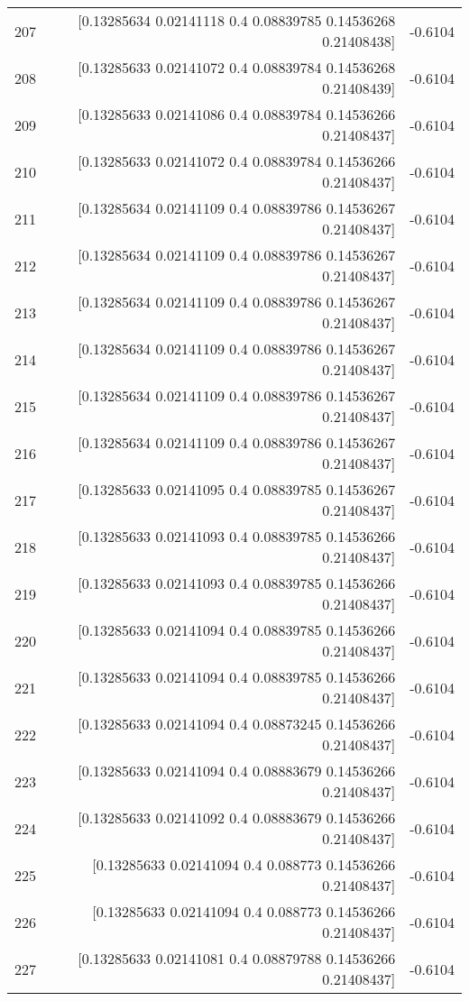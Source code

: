 \begin{longtable}{lrr}
207 & [0.13285634 0.02141118 0.4        0.08839785 0.14536268 0.21408438] & -0.6104 \\
208 & [0.13285633 0.02141072 0.4        0.08839784 0.14536268 0.21408439] & -0.6104 \\
209 & [0.13285633 0.02141086 0.4        0.08839784 0.14536266 0.21408437] & -0.6104 \\
210 & [0.13285633 0.02141072 0.4        0.08839784 0.14536266 0.21408437] & -0.6104 \\
211 & [0.13285634 0.02141109 0.4        0.08839786 0.14536267 0.21408437] & -0.6104 \\
212 & [0.13285634 0.02141109 0.4        0.08839786 0.14536267 0.21408437] & -0.6104 \\
213 & [0.13285634 0.02141109 0.4        0.08839786 0.14536267 0.21408437] & -0.6104 \\
214 & [0.13285634 0.02141109 0.4        0.08839786 0.14536267 0.21408437] & -0.6104 \\
215 & [0.13285634 0.02141109 0.4        0.08839786 0.14536267 0.21408437] & -0.6104 \\
216 & [0.13285634 0.02141109 0.4        0.08839786 0.14536267 0.21408437] & -0.6104 \\
217 & [0.13285633 0.02141095 0.4        0.08839785 0.14536267 0.21408437] & -0.6104 \\
218 & [0.13285633 0.02141093 0.4        0.08839785 0.14536266 0.21408437] & -0.6104 \\
219 & [0.13285633 0.02141093 0.4        0.08839785 0.14536266 0.21408437] & -0.6104 \\
220 & [0.13285633 0.02141094 0.4        0.08839785 0.14536266 0.21408437] & -0.6104 \\
221 & [0.13285633 0.02141094 0.4        0.08839785 0.14536266 0.21408437] & -0.6104 \\
222 & [0.13285633 0.02141094 0.4        0.08873245 0.14536266 0.21408437] & -0.6104 \\
223 & [0.13285633 0.02141094 0.4        0.08883679 0.14536266 0.21408437] & -0.6104 \\
224 & [0.13285633 0.02141092 0.4        0.08883679 0.14536266 0.21408437] & -0.6104 \\
225 & [0.13285633 0.02141094 0.4        0.088773   0.14536266 0.21408437] & -0.6104 \\
226 & [0.13285633 0.02141094 0.4        0.088773   0.14536266 0.21408437] & -0.6104 \\
227 & [0.13285633 0.02141081 0.4        0.08879788 0.14536266 0.21408437] & -0.6104 \\

\end{longtable}
